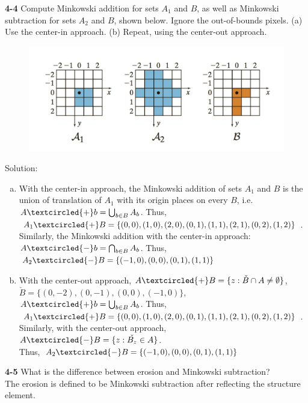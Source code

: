 \documentclass[a4paper]{article}
\begin{document}
\begin{spacing}{2.0}
	
	\noindent
	\textbf{4-4} Compute Minkowski addition for sets $A_1$ and $B$, as well as Minkowski subtraction for sets $A_2$ and $B$, shown below. Ignore the out-of-bounds pixels. (a) Use the center-in approach. (b) Repeat, using the center-out approach.
	\begin{figure}[H]
	\centering
	\includegraphics[width = 5in]{1.jpg}
	\end{figure}
	Solution:
	\begin{enumerate}[(a)]
	\item With the center-in approach, the Minkowski addition of sets $A_1$ and $B$ is the union of translation of $A_1$ with its origin places on every $B$, i.e. $A\textcircled{+}b = \bigcup_{b\in B}A_b$. Thus, $A_1\textcircled{+}B =  \{(0,0), (1,0), (2,0), (0,1), (1,1), (2,1), (0,2), (1,2)\}$.\\
		Similarly, the Minkowski addition with the center-in approach: $A\textcircled{-}b = \bigcap_{b\in B}A_b$. Thus, $A_2\textcircled{-}B = \{(-1,0), (0,0), (0,1), (1,1) \}$
	\item With the center-out approach, $A\textcircled{+}B = \{ z: \check{B} \cap A \neq \emptyset\}$, $\check{B} = \{ (0,-2), (0,-1), (0,0), (-1,0)\}$, $A\textcircled{+}b = \bigcup_{b\in B}A_b$. Thus, $A_1\textcircled{+}B =  \{(0,0), (1,0), (2,0), (0,1), (1,1), (2,1), (0,2), (1,2)\}$.\\
	Similarly, with the center-out approach, $A\textcircled{-}B = \{ z: \check{B_z} \in A\}$. \\Thus, $A_2\textcircled{-}B = \{(-1,0), (0,0), (0,1), (1,1) \}$
	\end{enumerate}
		
	\noindent
	\textbf{4-5} What is the difference between erosion and Minkowski subtraction?\\
	The erosion is defined to be Minkowski subtraction after reflecting the structure element.\\
	

\end{spacing}
\end{document}
